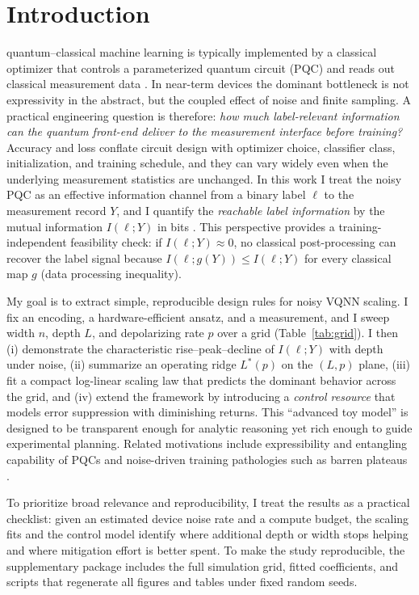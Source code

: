 \documentclass[]{ieeeaccess}
\newcommand{\MI}{I(\ell;Y)}
\begin{document}
\section{Introduction}
 quantum--classical machine learning is typically implemented by a classical optimizer that controls a parameterized quantum circuit (PQC) and reads out classical measurement data \cite{ref15,ref16}. In near-term devices the dominant bottleneck is not expressivity in the abstract, but the coupled effect of noise and finite sampling. A practical engineering question is therefore: \emph{how much label-relevant information can the quantum front-end deliver to the measurement interface before training?} Accuracy and loss conflate circuit design with optimizer choice, classifier class, initialization, and training schedule, and they can vary widely even when the underlying measurement statistics are unchanged. In this work I treat the noisy PQC as an effective information channel from a binary label $\ell$ to the measurement record $Y$, and I quantify the \emph{reachable label information} by the mutual information $\MI$ in bits \cite{ref3}. This perspective provides a training-independent feasibility check: if $\MI\approx 0$, no classical post-processing can recover the label signal because $I(\ell;g(Y))\le \MI$ for every classical map $g$ (data processing inequality). 

My goal is to extract simple, reproducible design rules for noisy VQNN scaling. I fix an encoding, a hardware-efficient ansatz, and a measurement, and I sweep width $n$, depth $L$, and depolarizing rate $p$ over a grid (Table~\ref{tab:grid}). I then (i) demonstrate the characteristic rise--peak--decline of $\MI$ with depth under noise, (ii) summarize an operating ridge $L^{\ast}(p)$ on the $(L,p)$ plane, (iii) fit a compact log-linear scaling law that predicts the dominant behavior across the grid, and (iv) extend the framework by introducing a \emph{control resource} that models error suppression with diminishing returns. This ``advanced toy model'' is designed to be transparent enough for analytic reasoning yet rich enough to guide experimental planning. Related motivations include expressibility and entangling capability of PQCs \cite{ref7} and noise-driven training pathologies such as barren plateaus \cite{ref4,ref5,ref6}.

To prioritize broad relevance and reproducibility, I treat the results as a practical checklist: given an estimated device noise rate and a compute budget, the scaling fits and the control model identify where additional depth or width stops helping and where mitigation effort is better spent. To make the study reproducible, the supplementary package includes the full simulation grid, fitted coefficients, and scripts that regenerate all figures and tables under fixed random seeds.
\end{document}
